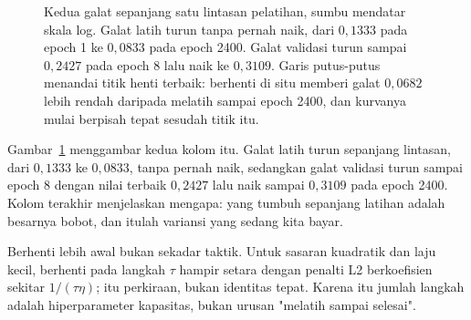 \begin{figure}[htbp]
\centering
{}
\caption{Kedua galat sepanjang satu lintasan pelatihan, sumbu mendatar skala log. Galat
latih turun tanpa pernah naik, dari $0{,}1333$ pada epoch 1 ke $0{,}0833$ pada epoch
2400. Galat validasi turun sampai $0{,}2427$ pada epoch 8 lalu naik ke $0{,}3109$. Garis
putus-putus menandai titik henti terbaik: berhenti di situ memberi galat $0{,}0682$ lebih
rendah daripada melatih sampai epoch 2400, dan kurvanya mulai berpisah tepat sesudah
titik itu.}
\label{fig:dua-kurva}
\end{figure}

Gambar~\ref{fig:dua-kurva} menggambar kedua kolom itu. Galat latih turun sepanjang
lintasan, dari $0{,}1333$ ke $0{,}0833$, tanpa pernah naik, sedangkan galat validasi
turun sampai epoch 8 dengan nilai terbaik $0{,}2427$ lalu naik sampai $0{,}3109$ pada
epoch 2400. Kolom terakhir menjelaskan mengapa: yang tumbuh sepanjang latihan adalah
besarnya bobot, dan itulah variansi yang sedang kita bayar.

Berhenti lebih awal bukan sekadar taktik. Untuk sasaran kuadratik dan laju kecil, berhenti
pada langkah $\tau$ hampir setara dengan penalti L2 berkoefisien sekitar
$1/(\tau\eta)$; itu perkiraan, bukan identitas tepat. Karena itu jumlah langkah adalah
hiperparameter kapasitas, bukan urusan "melatih sampai selesai".

